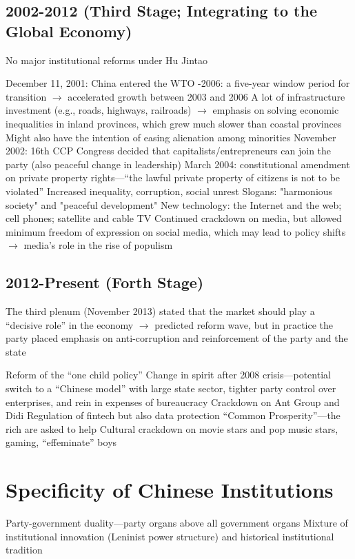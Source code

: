\documentclass[11pt]{article}
\theoremstyle{definition}
\theoremstyle{remark}
\begin{document}
\subsection{2002-2012 (Third Stage; Integrating to the Global Economy)}
No major institutional reforms under Hu Jintao

\begin{outline}[enumerate]
\1 December 11, 2001: China entered the WTO
-2006: a five-year window period for transition $\to$ accelerated growth between 2003 and 2006
\1 A lot of infrastructure investment (e.g., roads, highways, railroads) $\to$ emphasis on solving economic inequalities in inland provinces, which grew much slower than coastal provinces
	\2 Might also have the intention of easing alienation among minorities
\1 November 2002: 16th CCP Congress decided that capitalists/entrepreneurs can join the party (also peaceful change in leadership)
\1 March 2004: constitutional amendment on private property rights---``the lawful private property of citizens is not to be violated''
\1 Increased inequality, corruption, social unrest
\1 Slogans: "harmonious society" and "peaceful development"
\1 New technology: the Internet and the web; cell phones; satellite and cable TV
\1 Continued crackdown on media, but allowed minimum freedom of expression on social media, which may lead to policy shifts $\to$ media's role in the rise of populism
\end{outline}

\subsection{2012-Present (Forth Stage)}
The third plenum (November 2013) stated that the market should play a ``decisive role'' in the economy $\to$ predicted reform wave, but in practice the party placed emphasis on anti-corruption and reinforcement of the party and the state
\begin{outline}[enumerate]
\1 Reform of the ``one child policy''
\1 Change in spirit after 2008 crisis---potential switch to a ``Chinese model'' with large state sector, tighter party control over enterprises, and rein in expenses of bureaucracy
\1 Crackdown on Ant Group and Didi
\1 Regulation of fintech but also data protection
\1 ``Common Prosperity''---the rich are asked to help
\1 Cultural crackdown on movie stars and pop music stars, gaming, ``effeminate'' boys
\end{outline}
\clearpage

\section{Specificity of Chinese Institutions}
\begin{outline}[enumerate]
\1 Party-government duality---party organs above all government organs
\1 Mixture of institutional innovation (Leninist power structure) and historical institutional tradition
\end{outline}
\end{document}
